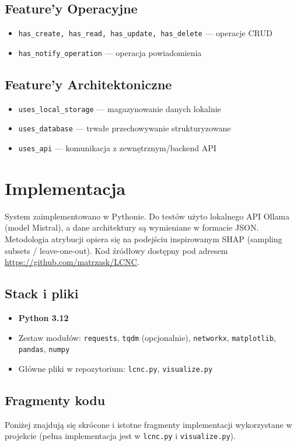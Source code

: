 \documentclass[12pt,a4paper]{article}
\begin{document}
\subsection{Feature'y Operacyjne}
\begin{itemize}
    \item \texttt{has\_create, has\_read, has\_update, has\_delete} --- operacje CRUD
    \item \texttt{has\_notify\_operation} --- operacja powiadomienia
\end{itemize}

\subsection{Feature'y Architektoniczne}
\begin{itemize}
    \item \texttt{uses\_local\_storage} --- magazynowanie danych lokalnie
    \item \texttt{uses\_database} --- trwałe przechowywanie strukturyzowane
    \item \texttt{uses\_api} --- komunikacja z zewnętrznym/backend API
\end{itemize}

\section{Implementacja}
System zaimplementowano w Pythonie. Do testów użyto lokalnego API Ollama (model Mistral), a dane architektury są wymieniane w formacie JSON. Metodologia atrybucji opiera się na podejściu inspirowanym SHAP (sampling subsets / leave-one-out). Kod źródłowy dostępny pod adresem \url{https://github.com/matrzask/LCNC}.

\subsection{Stack i pliki}
\begin{itemize}
    \item \textbf{Python 3.12}
    \item Zestaw modułów: \texttt{requests}, \texttt{tqdm} (opcjonalnie), \texttt{networkx}, \texttt{matplotlib}, \texttt{pandas}, \texttt{numpy}
    \item Główne pliki w repozytorium: \texttt{lcnc.py}, \texttt{visualize.py}
\end{itemize}

\subsection{Fragmenty kodu}
Poniżej znajdują się skrócone i istotne fragmenty implementacji wykorzystane w projekcie (pełna implementacja jest w \texttt{lcnc.py} i \texttt{visualize.py}).
\end{document}
